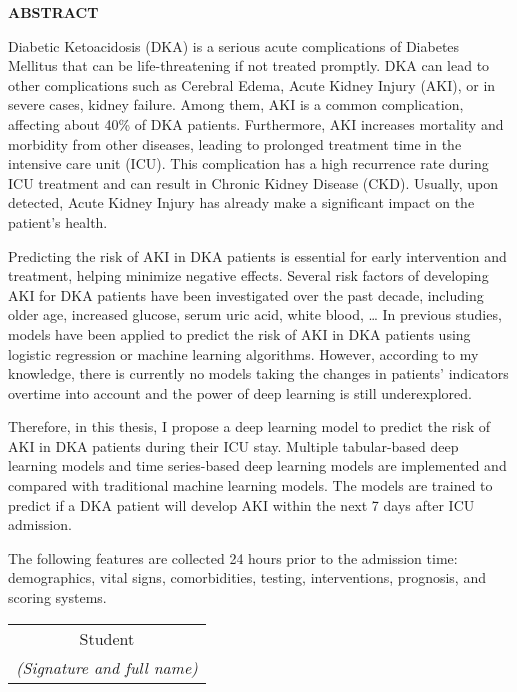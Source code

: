 \documentclass[../main.tex]{subfiles}
\begin{document}
\begin{center}
    \Large{\textbf{ABSTRACT}}\\
\end{center}
\vspace{1cm}

Diabetic Ketoacidosis (DKA) is a serious acute complications of Diabetes Mellitus that can be life-threatening if not treated promptly.
DKA can lead to other complications such as Cerebral Edema, Acute Kidney Injury (AKI), or in severe cases, kidney failure.
Among them, AKI is a common complication, affecting about 40\% of DKA patients.
Furthermore, AKI increases mortality and morbidity from other diseases, leading to prolonged treatment time in the intensive care unit (ICU).
This complication has a high recurrence rate during ICU treatment and can result in Chronic Kidney Disease (CKD).
Usually, upon detected, Acute Kidney Injury has already make a significant impact on the patient's health.

Predicting the risk of AKI in DKA patients is essential for early intervention and treatment, helping minimize negative effects.
Several risk factors of developing AKI for DKA patients have been investigated over the past decade, including older age, increased glucose, serum uric acid, white blood, \dots
In previous studies, models have been applied to predict the risk of AKI in DKA patients using logistic regression or machine learning algorithms.
However, according to my knowledge, there is currently no models taking the changes in patients' indicators overtime into account and the power of deep learning is still underexplored.

Therefore, in this thesis, I propose a deep learning model to predict the risk of AKI in DKA patients during their ICU stay.
Multiple tabular-based deep learning models and time series-based deep learning models are implemented and compared with traditional machine learning models.
The models are trained to predict if a DKA patient will develop AKI within the next 7 days after ICU admission.

The following features are collected 24 hours prior to the admission time: demographics, vital signs, comorbidities, testing, interventions, prognosis, and scoring systems.

\begin{flushright}
\begin{tabular}{@{}c@{}}
Student\\
\textit{(Signature and full name)}
\end{tabular}
\end{flushright}
\end{document}

